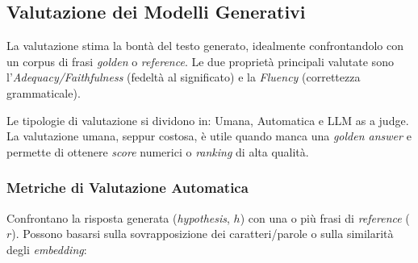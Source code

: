     \newpage

    \subsection{Valutazione dei Modelli Generativi}

        La valutazione stima la bontà del testo generato, idealmente confrontandolo con un corpus di frasi \textit{golden} o \textit{reference}. Le due proprietà principali valutate sono l'\textit{Adequacy/Faithfulness} (fedeltà al significato) e la \textit{Fluency} (correttezza grammaticale).

        Le tipologie di valutazione si dividono in: Umana, Automatica e LLM as a judge. La valutazione umana, seppur costosa, è utile quando manca una \textit{golden answer} e permette di ottenere \textit{score} numerici o \textit{ranking} di alta qualità.

        \subsubsection{Metriche di Valutazione Automatica}
    
            Confrontano la risposta generata (\textit{hypothesis}, $h$) con una o più frasi di \textit{reference} ($r$). Possono basarsi sulla sovrapposizione dei caratteri/parole o sulla similarità degli \textit{embedding}:


